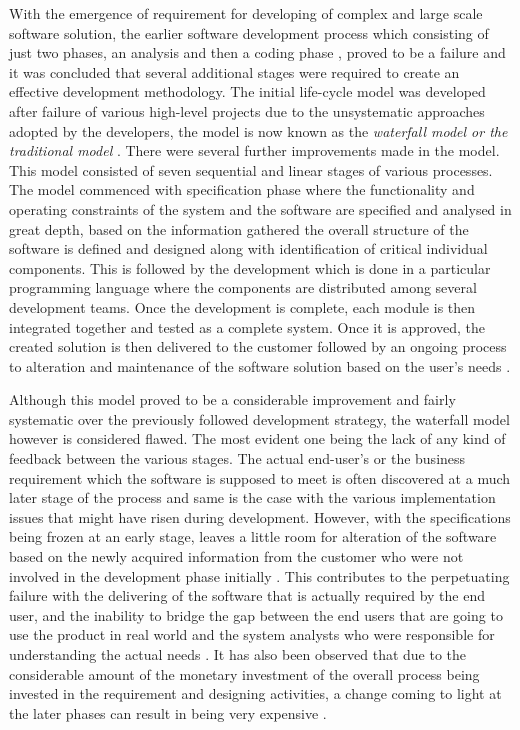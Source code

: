 \documentclass[12pt]{article}
\begin{document}
With the emergence of requirement for developing of complex and large scale software solution, the earlier software development process which consisting of just two phases, an analysis and then a coding phase \cite{royce1970managing}, proved to be a failure and it was concluded that several additional stages were required to create an effective development methodology. The initial life-cycle model was developed after failure of various high-level projects due to the unsystematic approaches adopted by the developers, the model is now known as the \textit{waterfall model or the traditional model}  \cite{royce1970managing}. There were several further improvements made in the model. This model consisted of seven sequential and linear stages of various processes. The model commenced with specification phase where the functionality and operating constraints of the system and the software are specified and analysed in great depth, based on the information gathered the overall structure of the software is defined and designed along with identification of critical individual components. This is followed by the development which is done in a particular programming language where the components are distributed among several development teams. Once the development is complete, each module is then integrated together and tested as a complete system. Once it is approved, the created solution is then delivered to the customer followed by an ongoing process to alteration and maintenance of the software solution based on the user's needs \cite{sommerville1996software}. 


Although this model proved to be a considerable improvement and fairly systematic over the previously followed development strategy, the waterfall model however is considered flawed. The most evident one being the lack of any kind of feedback between the various stages. The actual end-user's or the business requirement which the software is supposed to meet is often discovered at a much later stage of the process and same is the case with the various implementation issues that might have risen during development. However, with the specifications being frozen at an early stage, leaves a little room for alteration of the software based on the newly acquired information from the customer who were not involved in the development phase initially \cite{laplante2004demise}. This contributes to the perpetuating failure with the delivering of the software that is actually required by the end user, and the inability to bridge the gap between the end users that are going to use the product in real world and the system analysts who were responsible for understanding the actual needs \cite{mccracken1982life}. It has also been observed that due to the considerable amount of the monetary investment of the overall process being invested in the requirement and designing activities, a change coming to light at the later phases can result in being very expensive \cite{ji2011comparing}.
\end{document}
